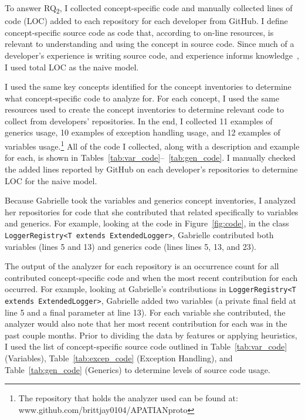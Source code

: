 To answer RQ\textsubscript{2}, I collected concept-specific code and manually collected lines of code (LOC) added to each repository for each developer from GitHub. 
I define concept-specific source code as code that, according to on-line resources, is relevant to understanding and using the concept in source code. 
Since much of a developer's experience is writing source code, and experience informs knowledge~\cite{bromme1995fusing,argote2011organizational}, I used total LOC as the naive model.

I used the same key concepts identified for the concept inventories to determine what concept-specific code to analyze for. 
For each concept, I used the same resources used to create the concept inventories to determine relevant code to collect from developers' repositories.
In the end, I collected 11 examples of generics usage, 10 examples of exception handling usage, and 12 examples of variables usage.\footnote{The repository that holds the analyzer used can be found at: www.github.com/brittjay0104/APATIANproto} All of the code I collected, along with a description and example for each, is shown in Tables~\ref{tab:var_code}--~\ref{tab:gen_code}. 
I manually checked the added lines reported by GitHub on each developer's repositories to determine LOC for the naive model.

Because Gabrielle took the variables and generics concept inventories, I analyzed her repositories for code that she contributed that related specifically to variables and generics. For example, looking at the code in Figure~\ref{fig:code}, in the class \texttt{LoggerRegistry<T extends ExtendedLogger>}, Gabrielle contributed both variables (lines 5 and 13) and generics code (lines lines 5, 13, and 23). 

The output of the analyzer for each repository is an occurrence count for all contributed concept-specific code and when the most recent contribution for each occurred.
For example, looking at Gabrielle's contributions in \texttt{LoggerRegistry<T extends ExtendedLogger>}, Gabrielle added two variables (a private final field at line 5 and a final parameter at line 13). For each variable she contributed, the analyzer would also note that her most recent contribution for each was in the past couple months.
Prior to dividing the data by features or applying heuristics, I used the list of concept-specific source code outlined in Table~\ref{tab:var_code} (Variables), Table~\ref{tab:excep_code} (Exception Handling), and Table~\ref{tab:gen_code} (Generics) to determine levels of source code usage.

